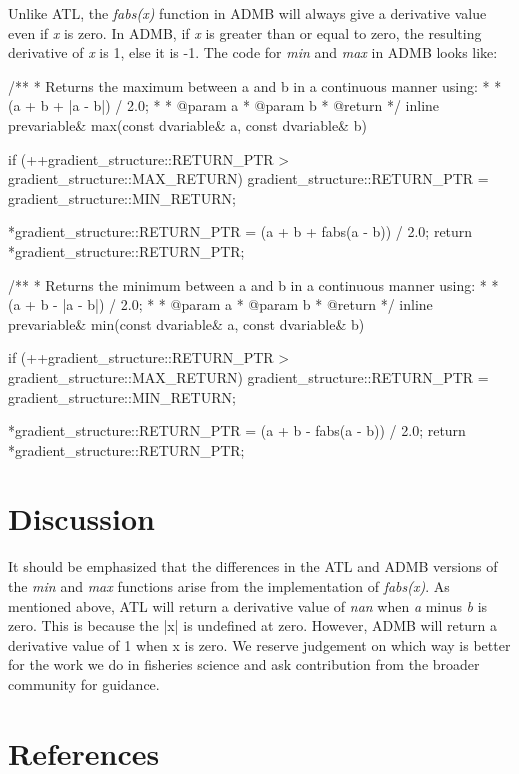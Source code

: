 \documentclass[oneside]{article}
\begin{document}
Unlike ATL, the \textit{fabs(x)} function in ADMB will always give a derivative value even if \textit{x} is zero. In ADMB, if \textit{x} is greater than or equal to zero, the resulting derivative of \textit{x} is 1, else it is -1.  The code for \textit{min} and \textit{max} in ADMB looks like: 
\begin{cppsource}

/**
 * Returns the maximum between a and b in a continuous manner using:
 * 
 * (a + b + |a - b|) / 2.0;
 * 
 * @param a
 * @param b
 * @return 
 */
inline prevariable& max(const dvariable& a, const dvariable& b) {
    if (++gradient_structure::RETURN_PTR > gradient_structure::MAX_RETURN)
        gradient_structure::RETURN_PTR = gradient_structure::MIN_RETURN;

    *gradient_structure::RETURN_PTR = (a + b + fabs(a - b)) / 2.0;
    return *gradient_structure::RETURN_PTR;
}


/**
 * Returns the minimum between a and b in a continuous manner using:
 * 
 * (a + b - |a - b|) / 2.0;
 * 
 * @param a
 * @param b
 * @return 
 */
inline prevariable& min(const dvariable& a, const dvariable& b) {
    if (++gradient_structure::RETURN_PTR > gradient_structure::MAX_RETURN)
        gradient_structure::RETURN_PTR = gradient_structure::MIN_RETURN;

    *gradient_structure::RETURN_PTR = (a + b - fabs(a - b)) / 2.0;
    return *gradient_structure::RETURN_PTR;
}

\end{cppsource} 



\section{Discussion}
It should be emphasized that the differences in the ATL and ADMB versions of the \textit{min} and \textit{max} functions arise from the implementation of \textit{fabs(x)}. As mentioned above, ATL will return a derivative value of \textit{nan} when \textit{a} minus \textit{b} is zero. This is because the |x| is undefined at zero. However, ADMB will return a derivative value of 1 when x is zero. We reserve judgement on which way is better for the work we do in fisheries science and ask contribution from the broader community for guidance. 
\section{References}
\end{document}

